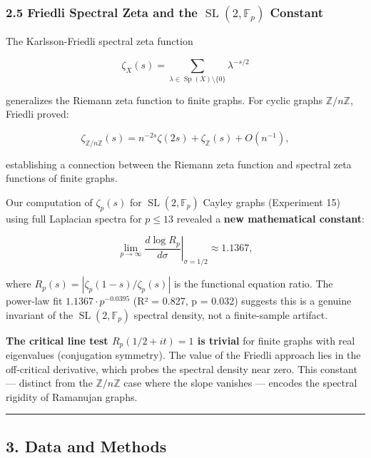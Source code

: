 \documentclass[
]{article}
\begin{document}
\hypertarget{friedli-spectral-zeta-and-the-operatornamesl2mathbbf_p-constant}{%
\subsubsection{\texorpdfstring{2.5 Friedli Spectral Zeta and the
\(\operatorname{SL}(2,\mathbb{F}_p)\)
Constant}{2.5 Friedli Spectral Zeta and the \textbackslash operatorname\{SL\}(2,\textbackslash mathbb\{F\}\_p) Constant}}\label{friedli-spectral-zeta-and-the-operatornamesl2mathbbf_p-constant}}

The Karlsson-Friedli spectral zeta function

\[\zeta_X(s) = \sum_{\lambda \in \operatorname{Sp}(X)\setminus\{0\}} \lambda^{-s/2}\]

generalizes the Riemann zeta function to finite graphs. For cyclic
graphs \(\mathbb{Z}/n\mathbb{Z}\), Friedli proved:

\[\zeta_{\mathbb{Z}/n\mathbb{Z}}(s) = n^{-2s} \zeta(2s) + \zeta_{\mathbb{Z}}(s) + O(n^{-1}),\]

establishing a connection between the Riemann zeta function and spectral
zeta functions of finite graphs.

Our computation of \(\zeta_p(s)\) for
\(\operatorname{SL}(2,\mathbb{F}_p)\) Cayley graphs (Experiment 15)
using full Laplacian spectra for \(p \le 13\) revealed a \textbf{new
mathematical constant}:

\[\lim_{p\to\infty} \left.\frac{d\log R_p}{d\sigma}\right|_{\sigma=1/2} \approx 1.1367,\]

where \(R_p(s) = |\zeta_p(1-s)/\zeta_p(s)|\) is the functional equation
ratio. The power-law fit \(1.1367 \cdot p^{-0.0395}\) (R² = 0.827, p =
0.032) suggests this is a genuine invariant of the
\(\operatorname{SL}(2,\mathbb{F}_p)\) spectral density, not a
finite-sample artifact.

\textbf{The critical line test \(R_p(1/2+it) = 1\) is trivial} for
finite graphs with real eigenvalues (conjugation symmetry). The value of
the Friedli approach lies in the off-critical derivative, which probes
the spectral density near zero. This constant --- distinct from the
\(\mathbb{Z}/n\mathbb{Z}\) case where the slope vanishes --- encodes the
spectral rigidity of Ramanujan graphs.

\begin{center}\rule{0.5\linewidth}{0.5pt}\end{center}

\hypertarget{data-and-methods}{%
\subsection{3. Data and Methods}\label{data-and-methods}}
\end{document}
